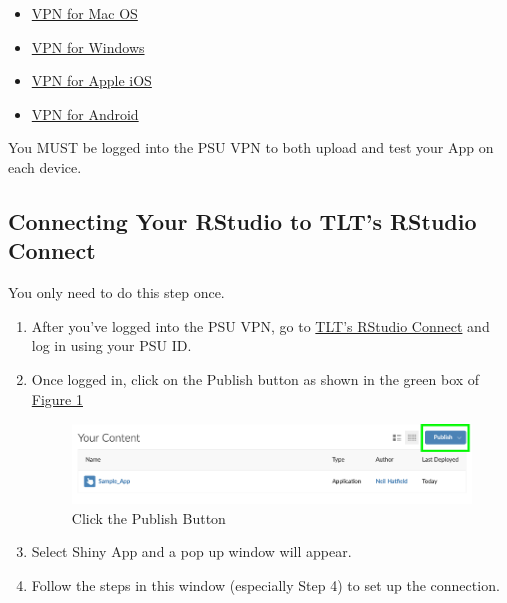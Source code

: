 \documentclass[
]{book}
\providecommand{\tightlist}{%
  \setlength{\itemsep}{0pt}\setlength{\parskip}{0pt}}
\begin{document}
\begin{itemize}
\tightlist
\item
  \href{https://pennstate.service-now.com/sp?id=kb_article\&sys_id=c628298bdb1d6f44a318fb671d961971}{VPN for Mac OS}
\item
  \href{https://pennstate.service-now.com/sp?id=kb_article_view\&sys_kb_id=c151310cdb85abc84222778ebf961957}{VPN for Windows}
\item
  \href{https://pennstate.service-now.com/sp?id=kb_article_view\&sys_kb_id=1de84eb6dbd5ab44a318fb671d9619a5}{VPN for Apple iOS}
\item
  \href{https://pennstate.service-now.com/sp?id=kb_article_view\&sys_kb_id=a35e0a7edb59ab44a318fb671d961964}{VPN for Android}
\end{itemize}

You MUST be logged into the PSU VPN to both upload and test your App on each device.

\hypertarget{connecting-your-rstudio-to-tlts-rstudio-connect}{%
\subsection{Connecting Your RStudio to TLT's RStudio Connect}\label{connecting-your-rstudio-to-tlts-rstudio-connect}}

You only need to do this step once.

\begin{enumerate}
\def\labelenumi{\arabic{enumi}.}
\tightlist
\item
  After you've logged into the PSU VPN, go to \href{https://rstudio-connect.tlt.psu.edu:3939/connect}{TLT's RStudio Connect} and log in using your PSU ID.
\item
  Once logged in, click on the Publish button as shown in the green box of \protect\hyperlink{fig:testing1}{Figure \ref{fig:testing1}}

  \begin{figure}
  \includegraphics[width=12.26in]{images/publish1} \caption{Click the Publish Button}\label{fig:testing1}
  \end{figure}
\item
  Select Shiny App and a pop up window will appear.
\item
  Follow the steps in this window (especially Step 4) to set up the connection.
\end{enumerate}
\end{document}
